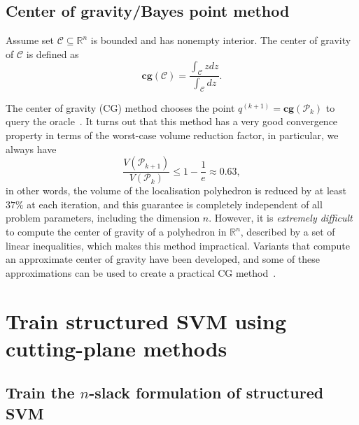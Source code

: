 \documentclass[9pt]{extarticle}
\begin{document}
\subsection{Center of gravity/Bayes point method}
\label{sec:cg}

Assume set $\mathcal{C} \subseteq \mathbb{R}^n$ is bounded and has nonempty interior. 
The center of gravity of $\mathcal{C}$ is defined as
\begin{equation}
\textbf{cg}(\mathcal{C}) = \frac{\int_\mathcal{C} z dz}{\int_\mathcal{C} dz}.
\end{equation}

The center of gravity (CG) method chooses the point $q^{(k+1)} = \textbf{cg}(\mathcal{P}_{k})$ to query the oracle~\cite{louche2015cutting}.
It turns out that this method has a very good convergence property in terms of the worst-case volume reduction factor,
in particular, we always have
\begin{equation}
\frac{V(\mathcal{P}_{k+1})}{V(\mathcal{P}_{k})} \le 1 - \frac{1}{e} \approx 0.63,
\end{equation}
in other words, the volume of the localisation polyhedron is reduced by at least $37\%$ at each iteration,
and this guarantee is completely independent of all problem parameters, including the dimension $n$.
However, it is \textit{extremely difficult} to compute the center of gravity of a polyhedron in $\mathbb{R}^n$, described by a set of linear inequalities,
which makes this method impractical.
Variants that compute an approximate center of gravity have been developed, and some of these approximations can be used to create a practical CG method~\cite{boydlocalization}.


\section{Train structured SVM using cutting-plane methods}
\label{sec:ssvm}


\subsection{Train the $n$-slack formulation of structured SVM}
\label{sec:nslackssvm}
\end{document}
